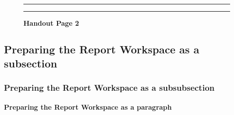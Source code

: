 \documentclass[]{article}
\begin{document}
\newpage

\begin{figure}[!ht]
    \hrule
    \caption{ \textbf{Handout Page 2} }
    \begin{center}
    \end{center}
    \label{fig:handout-2}
    \hrule
\end{figure}

\newpage

\subsection{Preparing the Report Workspace as a subsection}
\label{sec:appendix-setup}

\subsubsection{Preparing the Report Workspace as a subsubsection}
\label{sec:appendix-setup2}

\paragraph{Preparing the Report Workspace as a paragraph}
\label{sec:appendix-setup3}
\end{document}
